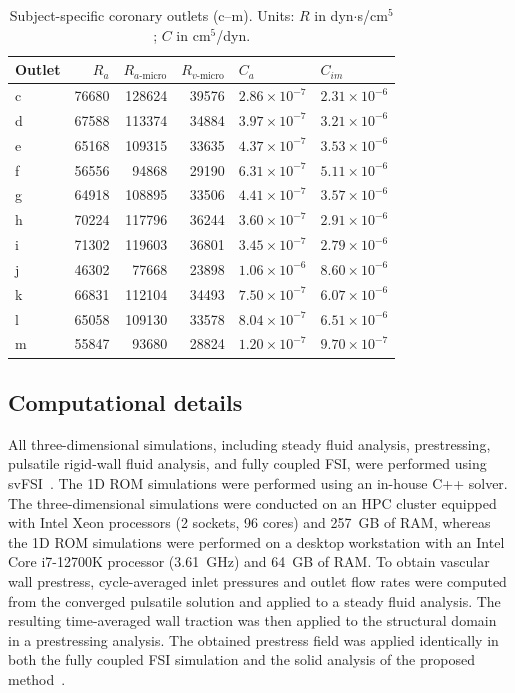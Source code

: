 \documentclass[master,english,final]{kaist-ucs}
\begin{document}
\begin{table}[ht]
\caption[Subject-specific coronary boundary conditions]{Subject-specific coronary outlets (c--m). Units: $R$ in dyn$\cdot$s/cm$^5$; $C$ in cm$^5$/dyn.}
\label{tab:bc-subject-coronary}
\begin{center}
\small
\begin{tabular}{lrrrll}
\hline\hline
Outlet & $R_a$ & $R_{a\text{-micro}}$ & $R_{v\text{-micro}}$ & $C_a$ & $C_{im}$ \\
\hline
c & 76680 & 128624 & 39576 & $2.86\times10^{-7}$ & $2.31\times10^{-6}$ \\
d & 67588 & 113374 & 34884 & $3.97\times10^{-7}$ & $3.21\times10^{-6}$ \\
e & 65168 & 109315 & 33635 & $4.37\times10^{-7}$ & $3.53\times10^{-6}$ \\
f & 56556 & 94868  & 29190 & $6.31\times10^{-7}$ & $5.11\times10^{-6}$ \\
g & 64918 & 108895 & 33506 & $4.41\times10^{-7}$ & $3.57\times10^{-6}$ \\
h & 70224 & 117796 & 36244 & $3.60\times10^{-7}$ & $2.91\times10^{-6}$ \\
i & 71302 & 119603 & 36801 & $3.45\times10^{-7}$ & $2.79\times10^{-6}$ \\
j & 46302 & 77668  & 23898 & $1.06\times10^{-6}$ & $8.60\times10^{-6}$ \\
k & 66831 & 112104 & 34493 & $7.50\times10^{-7}$ & $6.07\times10^{-6}$ \\
l & 65058 & 109130 & 33578 & $8.04\times10^{-7}$ & $6.51\times10^{-6}$ \\
m & 55847 & 93680  & 28824 & $1.20\times10^{-7}$ & $9.70\times10^{-7}$ \\
\hline\hline
\end{tabular}
\end{center}
\end{table}

\subsection{Computational details}
All three-dimensional simulations, including steady fluid analysis, prestressing, pulsatile rigid-wall fluid analysis, and fully coupled FSI, were performed using svFSI~\cite{zhu2022svfsi}. The 1D ROM simulations were performed using an in-house C++ solver. The three-dimensional simulations were conducted on an HPC cluster equipped with Intel Xeon processors (2 sockets, 96 cores) and 257~GB of RAM, whereas the 1D ROM simulations were performed on a desktop workstation with an Intel Core i7-12700K processor (3.61~GHz) and 64~GB of RAM. To obtain vascular wall prestress, cycle-averaged inlet pressures and outlet flow rates were computed from the converged pulsatile solution and applied to a steady fluid analysis. The resulting time-averaged wall traction was then applied to the structural domain in a prestressing analysis. The obtained prestress field was applied identically in both the fully coupled FSI simulation and the solid analysis of the proposed method~\cite{hsu2011prestress}.
\end{document}
